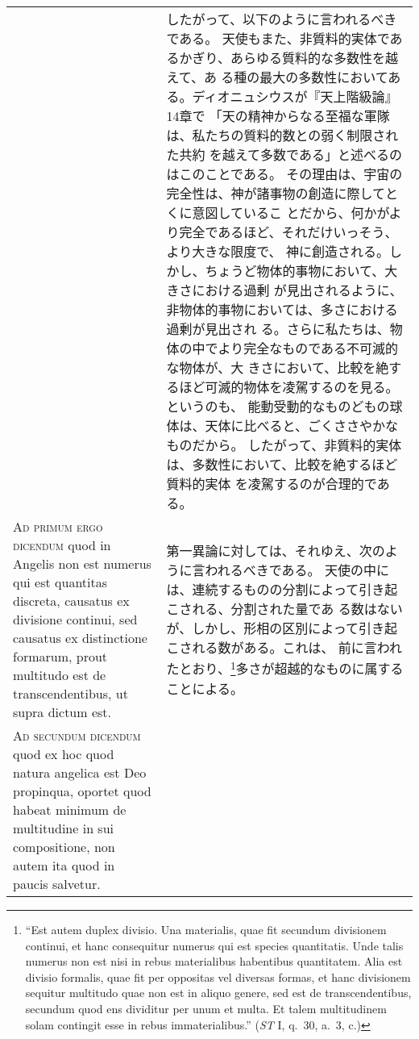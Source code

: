 \documentclass[10pt]{jsarticle} %
\begin{document}
\begin{longtable}{p{21em}p{21em}}
&

したがって、以下のように言われるべきである。
天使もまた、非質料的実体であるかぎり、あらゆる質料的な多数性を越えて、あ
 る種の最大の多数性においてある。ディオニュシウスが『天上階級論』14章で
 「天の精神からなる至福な軍隊は、私たちの質料的数との弱く制限された共約
 を越えて多数である」と述べるのはこのことである。
その理由は、宇宙の完全性は、神が諸事物の創造に際してとくに意図しているこ
 とだから、何かがより完全であるほど、それだけいっそう、より大きな限度で、
 神に創造される。しかし、ちょうど物体的事物において、大きさにおける過剰
 が見出されるように、非物体的事物においては、多さにおける過剰が見出され
 る。さらに私たちは、物体の中でより完全なものである不可滅的な物体が、大
 きさにおいて、比較を絶するほど可滅的物体を凌駕するのを見る。というのも、
 能動受動的なものどもの球体は、天体に比べると、ごくささやかなものだから。
 したがって、非質料的実体は、多数性において、比較を絶するほど質料的実体
 を凌駕するのが合理的である。


\\


{\scshape Ad primum ergo dicendum} quod in Angelis non
est numerus qui est quantitas discreta, causatus ex divisione continui,
sed causatus ex distinctione formarum, prout multitudo est de
transcendentibus, ut supra dictum est.


&

第一異論に対しては、それゆえ、次のように言われるべきである。
天使の中には、連続するものの分割によって引き起こされる、分割された量であ
 る数はないが、しかし、形相の区別によって引き起こされる数がある。これは、
 前に言われたとおり、\footnote{``Est autem duplex divisio. Una
 materialis, quae fit secundum divisionem continui, et hanc consequitur
 numerus qui est species quantitatis. Unde talis numerus non est nisi in
 rebus materialibus habentibus quantitatem. Alia est divisio formalis,
 quae fit per oppositas vel diversas formas, et hanc divisionem sequitur
 multitudo quae non est in aliquo genere, sed est de transcendentibus,
 secundum quod ens dividitur per unum et multa. Et talem multitudinem
 solam contingit esse in rebus immaterialibus.'' ({\itshape ST} I,
 q.~30, a.~3, c.)}多さが超越的なものに属することによる。

\\


{\scshape Ad secundum dicendum} quod ex hoc quod natura
angelica est Deo propinqua, oportet quod habeat minimum de multitudine
in sui compositione, non autem ita quod in paucis salvetur.


&


\end{longtable}
\end{document}
